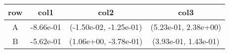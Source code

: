 \begin{tabular}{cccc}
\toprule
row&col1&col2&col3\tabularnewline
\midrule
A&-8.66e-01& (-1.50e-02, -1.25e-01)& (5.23e-01, 2.38e+00)\tabularnewline
B&-5.62e-01& (1.06e+00, -3.78e-01)& (3.93e-01, 1.43e-01)\tabularnewline
\bottomrule
\end{tabular}
